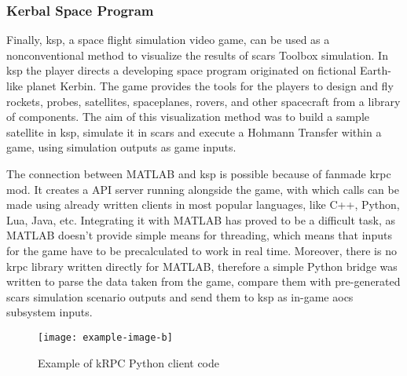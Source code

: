     \subsubsection{Kerbal Space Program}
        Finally, \ac{ksp}, a space flight simulation video game, can be used as a nonconventional method to visualize the results of \ac{scars} Toolbox simulation. In \ac{ksp} the player directs a developing space program originated on fictional Earth-like planet Kerbin. The game provides the tools for the players to design and fly rockets, probes, satellites, spaceplanes, rovers, and other spacecraft from a library of components.\cite{kerbals} The aim of this visualization method was to build a sample satellite in \ac{ksp}, simulate it in \ac{scars} and execute a Hohmann Transfer within a game, using simulation outputs as game inputs.

        The connection between MATLAB and \ac{ksp} is possible because of fanmade \ac{krpc} mod. It creates a API server running alongside the game, with which calls can be made using already written clients in most popular languages, like C++, Python, Lua, Java, etc. Integrating it with MATLAB has proved to be a difficult task, as MATLAB doesn't provide simple means for threading, which means that inputs for the game have to be precalculated to work in real time. Moreover, there is no \ac{krpc} library written directly for MATLAB, therefore a simple Python bridge was written to parse the data taken from the game, compare them with pre-generated \ac{scars} simulation scenario outputs and send them to \ac{ksp} as in-game \ac{aocs} subsystem inputs.

        \begin{figure}[H]
            \centering
            \texttt{[image: example-image-b]}
            \caption{Example of kRPC Python client code}
            \label{fig:krcp}
        \end{figure}